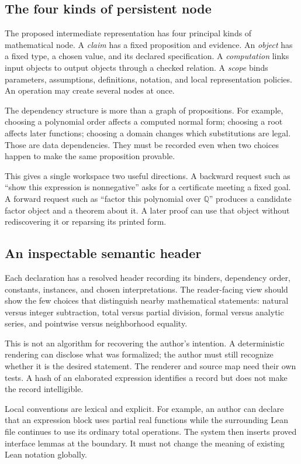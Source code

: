 \documentclass[11pt,a4paper]{article}
\newcommand{\Q}{\mathbb Q}
\theoremstyle{remark}
\begin{document}
\subsection{The four kinds of persistent node}
The proposed intermediate representation has four principal kinds of mathematical
node. A \emph{claim} has a fixed proposition and evidence. An \emph{object} has a
fixed type, a chosen value, and its declared specification. A \emph{computation}
links input objects to output objects through a checked relation. A
\emph{scope} binds parameters, assumptions, definitions, notation, and local
representation policies. An operation may create several nodes at once.

The dependency structure is more than a graph of propositions. For example,
choosing a polynomial order affects a computed normal form; choosing a root
affects later functions; choosing a domain changes which substitutions are
legal. Those are data dependencies. They must be recorded even when two choices
happen to make the same proposition provable.

This gives a single workspace two useful directions. A backward request such as
``show this expression is nonnegative'' asks for a certificate meeting a fixed
goal. A forward request such as ``factor this polynomial over $\Q$'' produces a
candidate factor object and a theorem about it. A later proof can use that
object without rediscovering it or reparsing its printed form.

\subsection{An inspectable semantic header}
Each declaration has a resolved header recording its binders, dependency order,
constants, instances, and chosen interpretations. The reader-facing view should
show the few choices that distinguish nearby mathematical statements: natural
versus integer subtraction, total versus partial division, formal versus analytic
series, and pointwise versus neighborhood equality.

This is not an algorithm for recovering the author's intention. A deterministic
rendering can disclose what was formalized; the author must still recognize
whether it is the desired statement. The renderer and source map need their own
tests. A hash of an elaborated expression identifies a record but does not make
the record intelligible.

Local conventions are lexical and explicit. For example, an author can declare
that an expression block uses partial real functions while the surrounding Lean
file continues to use its ordinary total operations. The system then inserts
proved interface lemmas at the boundary. It must not change the meaning of
existing Lean notation globally.
\end{document}
